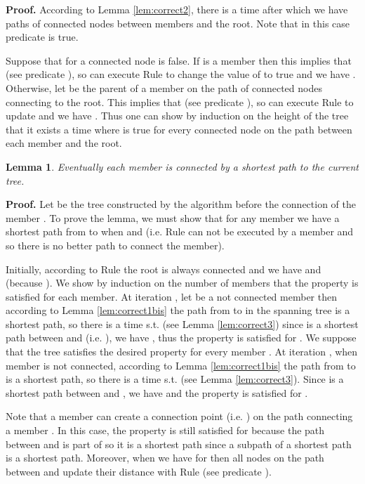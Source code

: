 \documentclass[11pt]{article}
\newtheorem{lemma}{Lemma}
\newenvironment{proof}{\noindent \begin{rm}{\textbf{Proof.} }}{\hspace*{\fill}\par\end{rm} \vspace{.3cm}}
\newcommand{\ARB}{}
\newcommand{\CRA}{}
\newcommand{\CRF}{}
\begin{document}
\begin{proof}
According to Lemma \ref{lem:correct2}, there is a time after which we have paths of connected nodes between members and the root. Note that in this case predicate  is true.

Suppose that  for a connected node  is false. If  is a member then this implies that  (see predicate ), so  can execute Rule \CRF\/ to change the value of  to true and we have . Otherwise, let  be the parent of a member  on the path of connected nodes connecting  to the root. This implies that  (see predicate ), so  can execute Rule \CRF\/ to update  and we have . Thus one can show by induction on the height of the tree that it exists a time where  is true for every connected node  on the path between each member and the root.
\end{proof}

\begin{lemma}
\label{lem:correct4}
Eventually each member is connected by a shortest path to the current tree.
\end{lemma}

\begin{proof}
Let  be the tree constructed by the algorithm before the
connection of the member . To prove the lemma, we must show that
for any member  we have a shortest path from  to 
when  and 
(i.e. Rule \ARB\/ can not be executed by a member and so there is no
better path to connect the member).

Initially, according to Rule \CRA\/ the root  is always connected and
we have  and
 (because ). We show by induction on
the number of members that the property is satisfied for each
member. At iteration , let  be a not connected member then
according to Lemma \ref{lem:correct1bis} the path  from  to
 in the spanning tree is a shortest path, so there is a time
s.t.  (see Lemma
\ref{lem:correct3}) since  is a shortest path between  and
 (i.e. ), we have , thus the
property is satisfied for . We suppose that the tree 
satisfies the desired property for every member . At
iteration , when member  is not connected, according to
Lemma \ref{lem:correct1bis} the path  from  to 
is a shortest path, so there is a time
s.t.  (see Lemma
\ref{lem:correct3}). Since  is a shortest path between
 and , we have  and the
property is satisfied for .

Note that a member  can create a connection point 
(i.e. ) on the path  connecting a
member . In this case, the property is still satisfied
for  because the path between  and  is part of  so
it is a shortest path since a subpath of a shortest path is a shortest
path. Moreover, when we have  for  then
all nodes on the path between  and  update their distance with
Rule \ARB\/ (see predicate ).
\end{proof}
\end{document}
